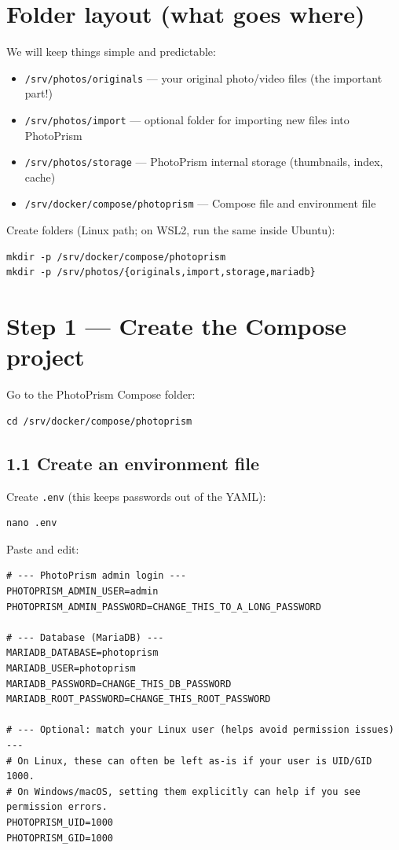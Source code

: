 \section{Folder layout (what goes where)}
We will keep things simple and predictable:

\begin{itemize}[leftmargin=*]
  \item \texttt{/srv/photos/originals} --- your original photo/video files (the important part!)
  \item \texttt{/srv/photos/import} --- optional folder for importing new files into PhotoPrism
  \item \texttt{/srv/photos/storage} --- PhotoPrism internal storage (thumbnails, index, cache)
  \item \texttt{/srv/docker/compose/photoprism} --- Compose file and environment file
\end{itemize}

Create folders (Linux path; on WSL2, run the same inside Ubuntu):

\begin{lstlisting}
mkdir -p /srv/docker/compose/photoprism
mkdir -p /srv/photos/{originals,import,storage,mariadb}
\end{lstlisting}


\section{Step 1 --- Create the Compose project}
Go to the PhotoPrism Compose folder:

\begin{lstlisting}
cd /srv/docker/compose/photoprism
\end{lstlisting}

\subsection{1.1 Create an environment file}
Create \texttt{.env} (this keeps passwords out of the YAML):

\begin{lstlisting}
nano .env
\end{lstlisting}

Paste and edit:

\begin{lstlisting}
# --- PhotoPrism admin login ---
PHOTOPRISM_ADMIN_USER=admin
PHOTOPRISM_ADMIN_PASSWORD=CHANGE_THIS_TO_A_LONG_PASSWORD

# --- Database (MariaDB) ---
MARIADB_DATABASE=photoprism
MARIADB_USER=photoprism
MARIADB_PASSWORD=CHANGE_THIS_DB_PASSWORD
MARIADB_ROOT_PASSWORD=CHANGE_THIS_ROOT_PASSWORD

# --- Optional: match your Linux user (helps avoid permission issues) ---
# On Linux, these can often be left as-is if your user is UID/GID 1000.
# On Windows/macOS, setting them explicitly can help if you see permission errors.
PHOTOPRISM_UID=1000
PHOTOPRISM_GID=1000
\end{lstlisting}

